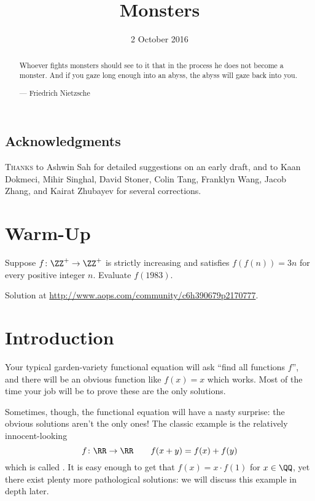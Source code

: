 \documentclass[11pt]{scrartcl}
\begin{document}
\title{Monsters}
\date{2 October 2016}
\maketitle
\begin{abstract}
  \sffamily\small
  Whoever fights monsters should see to it that in the process
  he does not become a monster.
  And if you gaze long enough into an abyss,
  the abyss will gaze back into you.

  \medskip

  --- Friedrich Nietzsche
\end{abstract}

\subsection*{Acknowledgments}
\textsc{Thanks} to Ashwin Sah for detailed suggestions on an early draft,
and to Kaan Dokmeci, Mihir Singhal, David Stoner, Colin Tang, Franklyn Wang,
Jacob Zhang, and Kairat Zhubayev for several corrections.

\section{Warm-Up}
\begin{problem}
  Suppose $f \colon \ZZ^+ \to \ZZ^+$ is strictly increasing and
  satisfies $f(f(n)) = 3n$ for every positive integer $n$.
  Evaluate $f(1983)$.
\end{problem}
\noindent Solution at \url{http://www.aops.com/community/c6h390679p2170777}.

\section{Introduction}
Your typical garden-variety functional equation will ask ``find all functions $f$'',
and there will be an obvious function like $f(x) = x$ which works.
Most of the time your job will be to prove these are the only solutions.

Sometimes, though, the functional equation will have a nasty surprise: the obvious solutions
aren't the only ones! The classic example is the relatively
innocent-looking \[ f \colon \RR \to \RR \qquad f(x+y) = f(x)+f(y) \]
which is called .
It is easy enough to get that $f(x) = x \cdot f(1)$ for $x \in \QQ$,
yet there exist plenty more pathological solutions:
we will discuss this example in depth later.
\end{document}
